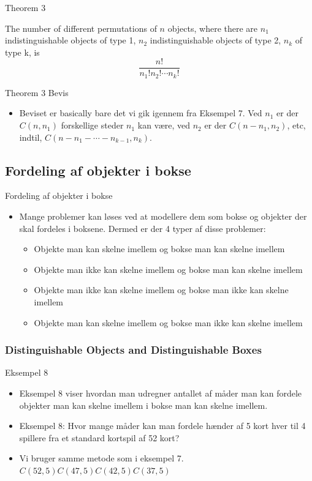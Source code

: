 \documentclass{beamer}
\begin{document}
\begin{frame}{Theorem 3}
   \begin{theorem}
       The number of different permutations of $n$ objects, where there are $n_1$ indistinguishable objects of type 1, $n_2$ indistinguishable objects of type 2, $n_k$ of type k, is
       $$\frac{n!}{n_1!n_2!\cdots n_k!}$$
   \end{theorem} 
\end{frame}
\begin{frame}{Theorem 3 Bevis}
   \begin{itemize}
       \item Beviset er basically bare det vi gik igennem fra Eksempel 7. Ved $n_1$ er der $C(n,n_1)$ forskellige steder $n_1$ kan være, ved $n_2$ er der $C(n-n_1, n_2)$, etc, indtil, $C(n-n_1 - \cdots - n_{k-1}, n_k)$.
   \end{itemize} 
\end{frame}

\subsection{Fordeling af objekter i bokse}
\begin{frame}{Fordeling af objekter i bokse}
   \begin{itemize}
       \item Mange problemer kan løses ved at modellere dem som bokse og objekter der skal fordeles i boksene. Dermed er der 4 typer af disse problemer:
       \begin{itemize}
           \item Objekte man kan skelne imellem og bokse man kan skelne imellem
           \item Objekte man ikke kan skelne imellem og bokse man kan skelne imellem
           \item Objekte man ikke kan skelne imellem og bokse man ikke kan skelne imellem
           \item Objekte man kan skelne imellem og bokse man ikke kan skelne imellem
       \end{itemize}
   \end{itemize} 
\end{frame}

\subsubsection{Distinguishable Objects and Distinguishable Boxes}
\begin{frame}{Eksempel 8}
\begin{itemize}
    \item<1-> Eksempel 8 viser hvordan man udregner antallet af måder man kan fordele objekter man kan skelne imellem i bokse man kan skelne imellem. 
    \item<1-> Eksempel 8: Hvor mange måder kan man fordele hænder af 5 kort hver til 4 spillere fra et standard kortspil af 52 kort? 
    \item<2-> Vi bruger samme metode som i eksempel 7. $C(52,5)C(47,5)C(42,5)C(37,5)$
\end{itemize}
\end{frame}
\end{document}
